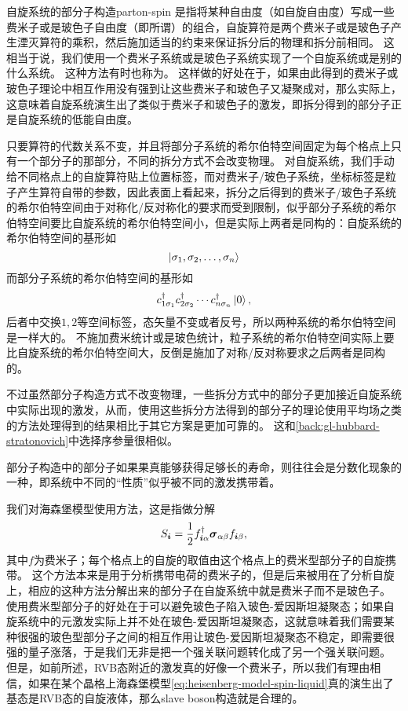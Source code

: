 \begin{back}{自旋系统的部分子构造}{parton-spin}
    是指将某种自由度（如自旋自由度）写成一些费米子或是玻色子自由度（即所谓）的组合，自旋算符是两个费米子或是玻色子产生湮灭算符的乘积，然后施加适当的约束来保证拆分后的物理和拆分前相同。
    这相当于说，我们使用一个费米子系统或是玻色子系统实现了一个自旋系统或是别的什么系统。
    这种方法有时也称为。
    这样做的好处在于，如果由此得到的费米子或玻色子理论中相互作用没有强到让这些费米子和玻色子又凝聚成对，那么实际上，这意味着自旋系统演生出了类似于费米子和玻色子的激发，即拆分得到的部分子正是自旋系统的低能自由度。

    只要算符的代数关系不变，并且将部分子系统的希尔伯特空间固定为每个格点上只有一个部分子的那部分，不同的拆分方式不会改变物理。
    对自旋系统，我们手动给不同格点上的自旋算符贴上位置标签，而对费米子/玻色子系统，坐标标签是粒子产生算符自带的参数，因此表面上看起来，拆分之后得到的费米子/玻色子系统的希尔伯特空间由于对称化/反对称化的要求而受到限制，似乎部分子系统的希尔伯特空间要比自旋系统的希尔伯特空间小，但是实际上两者是同构的：自旋系统的希尔伯特空间的基形如
    \[
        \ket{\sigma_1, \sigma_2, \ldots, \sigma_n}
    \]
    而部分子系统的希尔伯特空间的基形如
    \[
        {c}^\dagger_{1 \sigma_1} {c}^\dagger_{2 \sigma_2} \cdots {c}^\dagger_{n \sigma_n} \ket{0},
    \]
    后者中交换$1, 2$等空间标签，态矢量不变或者反号，所以两种系统的希尔伯特空间是一样大的。
    不施加费米统计或是玻色统计，粒子系统的希尔伯特空间实际上要比自旋系统的希尔伯特空间大，反倒是施加了对称/反对称要求之后两者是同构的。

    不过虽然部分子构造方式不改变物理，一些拆分方式中的部分子更加接近自旋系统中实际出现的激发，从而，使用这些拆分方法得到的部分子的理论使用平均场之类的方法处理得到的结果相比于其它方案是更加可靠的。
    这和\autoref{back:gl-hubbard-stratonovich}中选择序参量很相似。

    部分子构造中的部分子如果果真能够获得足够长的寿命，则往往会是分数化现象的一种，即系统中不同的“性质”似乎被不同的激发携带着。
\end{back}

我们对海森堡模型使用方法，这是指做分解
\begin{equation}
    {S}_{\vb*{i}} = \frac{1}{2} {f}_{\vb*{i} \alpha}^\dagger \vb*{\sigma}_{\alpha \beta} f_{\vb*{i} \beta},
\end{equation}
其中${f}$为费米子；每个格点上的自旋的取值由这个格点上的费米型部分子的自旋携带。
这个方法本来是用于分析携带电荷的费米子的，但是后来被用在了分析自旋上，相应的这种方法分解出来的部分子在自旋系统中就是费米子而不是玻色子。
使用费米型部分子的好处在于可以避免玻色子陷入玻色-爱因斯坦凝聚态；如果自旋系统中的元激发实际上并不处在玻色-爱因斯坦凝聚态，这就意味着我们需要某种很强的玻色型部分子之间的相互作用让玻色-爱因斯坦凝聚态不稳定，即需要很强的量子涨落，于是我们无非是把一个强关联问题转化成了另一个强关联问题。
但是，如前所述，RVB态附近的激发真的好像一个费米子，所以我们有理由相信，如果在某个晶格上海森堡模型\eqref{eq:heisenberg-model-spin-liquid}真的演生出了基态是RVB态的自旋液体，那么slave boson构造就是合理的。

